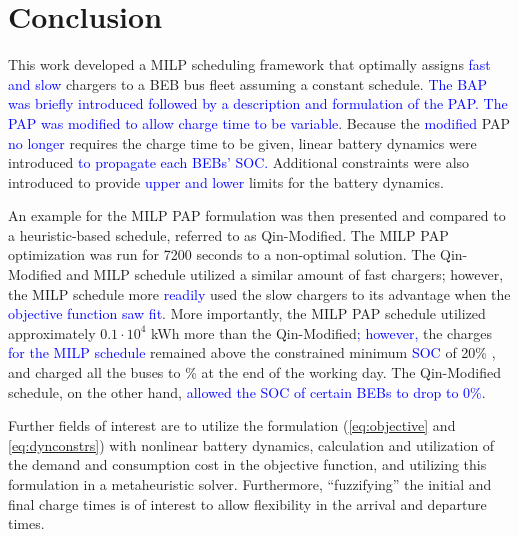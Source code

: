 \documentclass[utf8]{FrontiersinHarvard}
\newcommand{\bcharge}{0.7 }                                                     %
\newcommand{\mincharge}{20\% }                                                  %
\newcommand{\timeran}{7200 }                                                    %
\begin{document}
\section{Conclusion}
\label{sec:conclusion}
This work developed a MILP scheduling framework that optimally assigns \textcolor{blue}{fast and slow}
chargers to a BEB bus fleet assuming a constant schedule. \textcolor{blue}{The BAP was briefly introduced followed by a description and formulation of the PAP.} \textcolor{blue}{The PAP was modified to allow charge time to be variable}. Because the \textcolor{blue}{modified} PAP \textcolor{blue}{no longer}
requires the charge time to be given, linear battery dynamics were introduced \textcolor{blue}{to propagate each BEBs' SOC.} Additional constraints were also introduced to provide \textcolor{blue}{upper and lower}
limits for the battery dynamics.

An example for the MILP PAP formulation was then presented and compared to a heuristic-based schedule, referred to as
Qin-Modified. The MILP PAP optimization was run for \timeran seconds to a non-optimal solution. The Qin-Modified and
MILP schedule utilized a similar amount of fast chargers; however, the MILP schedule more
\textcolor{blue}{readily} used the slow chargers to its advantage when the
\textcolor{blue}{objective function saw fit}. More importantly, the MILP PAP schedule utilized approximately
\(0.1\cdot10^4\) kWh more than the Qin-Modified\textcolor{blue}{; however,} the charges \textcolor{blue}{for the MILP schedule} remained above the constrained minimum \textcolor{blue}{SOC} of \mincharge, and charged all
the buses to \fpeval{\bcharge *100}\% at the end of the working day. The Qin-Modified schedule, on the other hand,
\textcolor{blue}{allowed the SOC of certain BEBs to drop to 0\%}.

Further fields of interest are to utilize the formulation (\autoref{eq:objective} and \autoref{eq:dynconstrs}) with
nonlinear battery dynamics, calculation and utilization of the demand and consumption cost in the objective function,
and utilizing this formulation in a metaheuristic solver. Furthermore, ``fuzzifying'' the initial and final charge times
is of interest to allow flexibility in the arrival and departure times.




\nolinenumbers
\clearpage
\end{document}
